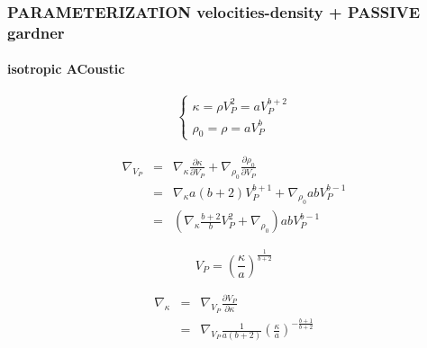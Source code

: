 \documentclass[9pt]{beamer}
\newcommand{\partderi}[2]{\frac{\partial#1}{\partial#2}}
\begin{document}
\begin{frame}\frametitle{PARAMETERIZATION velocities-density + PASSIVE gardner}
\framesubtitle{isotropic ACoustic}

  \begin{center}
  \end{center}

  \begin{minipage}{0.5\linewidth}
    \[\left\{ \begin{array}{l}
      \kappa = \rho V_P^2 = a V_P^{b+2} \\
      \rho_0 = \rho = a V_P ^{b}
    \end{array} \right.\]
    
    \begin{eqnarray}
      \nabla_{V_P} &=& \nabla_{\kappa} \partderi{\kappa}{V_P} + \nabla_{\rho_0} \partderi{\rho_0}{V_P} \nonumber\\
                   &=& \nabla_{\kappa} a(b+2) V_P^{b+1} + \nabla_{\rho_0} ab V_P^{b-1} \nonumber\\
                   &=& \left( \nabla_{\kappa} \frac{b+2}{b} V_P^2 + \nabla_{\rho_0} \right) ab V_P^{b-1} \nonumber
    \end{eqnarray}

  \end{minipage} \vline
  \begin{minipage}{0.45\linewidth}
    \[ V_P = \left(\frac{\kappa}{a}\right)^{\frac{1}{b+2}} \]
    
    \begin{eqnarray}
      \nabla_{\kappa} &=& \nabla_{V_P} \partderi{V_P}{\kappa} \nonumber\\
                      &=& \nabla_{V_P} \frac{1}{a(b+2)} \left(\frac{\kappa}{a}\right)^{-\frac{b+1}{b+2}} \nonumber
    \end{eqnarray}
  \end{minipage}

\end{frame}
\end{document}
